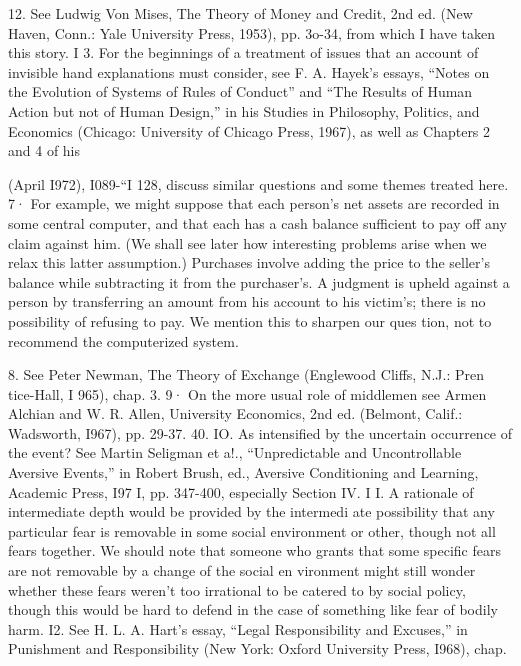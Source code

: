 \documentclass[11pt,openany]{book}
\begin{document}
{12. See Ludwig Von Mises, The Theory of Money and Credit, 2nd ed. (New Haven, Conn.: Yale University Press, 1953), pp. 3o-34, from which I have taken this story. I 3. For the beginnings of a treatment of issues that an account of invisible hand explanations must consider, see F. A. Hayek's essays, ``Notes on the Evolution of Systems of Rules of Conduct'' and ``The Results of Human Action but not of Human Design,'' in his Studies in Philosophy, Politics, and Economics (Chicago: University of Chicago Press, 1967), as well as Chapters 2 and 4 of his\par

(April I972), I089-``I 128, discuss similar questions and some themes treated here. 7· For example, we might suppose that each person's net assets are recorded in some central computer, and that each has a cash balance sufficient to pay off any claim against him. (We shall see later how interesting problems arise when we relax this latter assumption.) Purchases involve adding the price to the seller's balance while subtracting it from the purchaser's. A judgment is upheld against a person by transferring an amount from his account to his victim's; there is no possibility of refusing to pay. We mention this to sharpen our ques tion, not to recommend the computerized system.\par

8. See Peter Newman, The Theory of Exchange (Englewood Cliffs, N.J.: Pren tice-Hall, I 965), chap. 3. 9· On the more usual role of middlemen see Armen Alchian and W. R. Allen, University Economics, 2nd ed. (Belmont, Calif.: Wadsworth, I967), pp. 29-37. 40. IO. As intensified by the uncertain occurrence of the event? See Martin Seligman et a!., ``Unpredictable and Uncontrollable Aversive Events,'' in Robert Brush, ed., Aversive Conditioning and Learning, Academic Press, I97 I, pp. 347-400, especially Section IV. I I. A rationale of intermediate depth would be provided by the intermedi ate possibility that any particular fear is removable in some social environment or other, though not all fears together. We should note that someone who grants that some specific fears are not removable by a change of the social en vironment might still wonder whether these fears weren't too irrational to be catered to by social policy, though this would be hard to defend in the case of something like fear of bodily harm. I2. See H. L. A. Hart's essay, ``Legal Responsibility and Excuses,'' in Punishment and Responsibility (New York: Oxford University Press, I968), chap.\par

}
\end{document}

